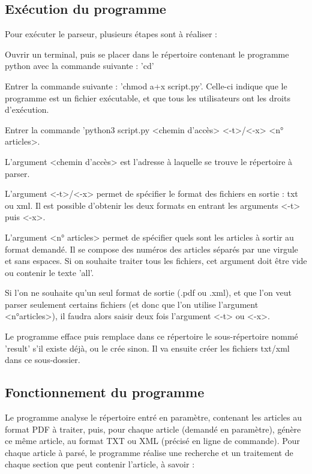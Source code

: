 \documentclass[11pt,a4paper]{article}
\begin{document}
\subsection{Exécution du programme}

Pour exécuter le parseur, plusieurs étapes sont à réaliser : 

\begin{etapes}
\item  Ouvrir un terminal, puis se placer dans le répertoire contenant le programme python avec la commande suivante : 'cd'
\item Entrer la commande suivante : 'chmod a+x script.py'. Celle-ci indique que le programme est un fichier exécutable, et que tous les utilisateurs ont les droits d'exécution.
\item Entrer la commande 'python3 script.py <chemin d'accès> <-t>/<-x> <n° articles>.

L'argument <chemin d'accès> est l'adresse à laquelle se trouve le répertoire à parser.

L'argument <-t>/<-x> permet de spécifier le format des fichiers en sortie : txt ou xml. Il est possible d'obtenir les deux formats en entrant les arguments <-t> puis <-x>.

L'argument <n° articles> permet de spécifier quels sont les articles à sortir au format demandé. Il se compose des numéros des articles séparés par une virgule et sans espaces. Si on souhaite traiter tous les fichiers, cet argument doit être vide ou contenir le texte 'all'.

Si l'on ne souhaite qu'un seul format de sortie (.pdf ou .xml), et que l'on veut parser seulement certains fichiers (et donc que l'on utilise l'argument <n°articles>), il faudra alors saisir deux fois l'argument <-t> ou <-x>.

Le programme efface puis remplace dans ce répertoire le sous-répertoire nommé 'result' s'il existe déjà, ou le crée sinon. Il va ensuite créer les fichiers txt/xml dans ce sous-dossier. 

\end{etapes}

\subsection{Fonctionnement du programme}

Le programme analyse le répertoire entré en paramètre, contenant les articles au format PDF à traiter, puis, pour chaque article (demandé en paramètre), génère ce même article, au format TXT ou XML (précisé en ligne de commande).
Pour chaque article à parsé, le programme réalise une recherche et un traitement de chaque section que peut contenir l'article, à savoir :
\end{document}
